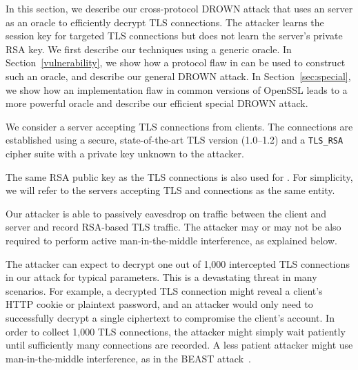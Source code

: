 In this section, we describe our cross-protocol DROWN attack that uses an
\ssltwo server as an oracle to efficiently decrypt TLS connections. The
attacker learns the session key for targeted TLS connections but does not
learn the server's private RSA key. We first describe our techniques using a
generic \ssltwo oracle. In Section~\ref{vulnerability}, we show how a
protocol flaw in \ssltwo can be used to construct such an oracle, and
describe our general DROWN attack. In Section~\ref{sec:special}, we show how
an implementation flaw in common versions of OpenSSL leads to a more powerful
oracle and describe our efficient special DROWN attack.


\label{sec:attack-scenario}

We consider a server accepting TLS connections from clients. The connections are established using a secure, state-of-the-art TLS version (1.0--1.2) and a \texttt{TLS\_RSA} cipher suite with a private key unknown to the attacker.

The same RSA public key as the TLS connections is also used for \ssltwo. For
simplicity, we will refer to the servers accepting TLS and \ssltwo
connections as the same entity.

Our attacker is able to passively eavesdrop on traffic between the client and
server and record RSA-based TLS traffic.
The attacker may or may not be also required to perform active man-in-the-middle
interference, as explained below.

The attacker can expect to decrypt one out of 1,000 intercepted TLS
connections in our attack for typical parameters. This is a devastating
threat in many scenarios. For example, a decrypted TLS connection might
reveal a client's HTTP cookie or plaintext password, and an attacker would
only need to successfully decrypt a single ciphertext to compromise the
client's account. In order to collect 1,000 TLS connections, the attacker
might simply wait patiently until sufficiently many connections are recorded.
A less patient attacker might use man-in-the-middle interference, as in the
BEAST attack~\cite{beast-2011}.

